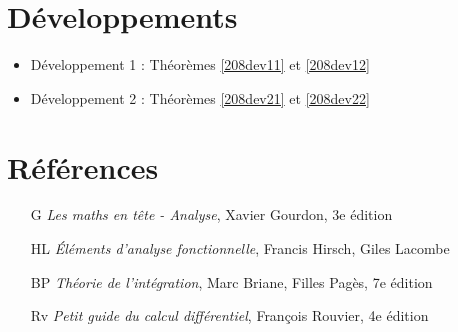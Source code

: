 \documentclass[10pt, a4paper, parskip=full, twoside, twocolumn]{report}
\begin{document}
\section*{Développements}
\begin{itemize}
	\item Développement 1 : Théorèmes \ref{208dev11} et \ref{208dev12}
	\item Développement 2 : Théorèmes \ref{208dev21} et \ref{208dev22}
\end{itemize}

\section*{Références}
\begin{itemize}
	\item[G] \emph{Les maths en tête - Analyse}, Xavier Gourdon, 3e édition 
	\item[HL] \emph{Éléments d'analyse fonctionnelle}, Francis Hirsch, Giles Lacombe
	\item[BP] \emph{Théorie de l'intégration}, Marc Briane, Filles Pagès, 7e édition
	\item[Rv] \emph{Petit guide du calcul différentiel}, François Rouvier, 4e édition
\end{itemize}
\end{document}
